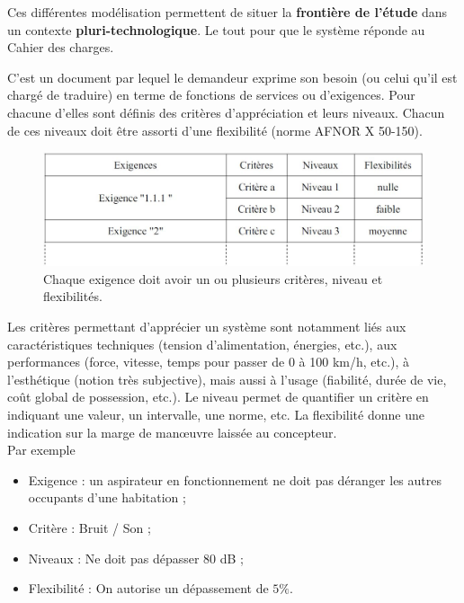 \documentclass[
	11pt, %
	fleqn, %
	a4paper, %
]{LegrandOrangeBook}
\begin{document}
Ces différentes modélisation permettent de situer la \textbf{frontière de l’étude} dans un contexte \textbf{pluri-technologique}. Le tout pour que le système réponde au Cahier des charges.\\

\begin{definition}
    C’est un document par lequel le demandeur exprime son besoin (ou celui qu'il est chargé de
traduire) en terme de fonctions de services ou d’exigences. Pour chacune d’elles sont définis
des critères d’appréciation et leurs niveaux. Chacun de ces niveaux doit être assorti d’une
flexibilité (norme AFNOR X 50-150).\\
\end{definition}

\begin{figure}[H] %
	\centering %
	\includegraphics[width=1\textwidth]{Images/sys2.JPG} %
	\caption{Chaque exigence doit avoir un ou plusieurs critères, niveau et flexibilités.}
	\label{sys2} %
\end{figure}

Les critères permettant d’apprécier un système sont notamment liés aux caractéristiques
techniques (tension d’alimentation, énergies, etc.), aux performances (force, vitesse, temps pour
passer de 0 à 100 km/h, etc.), à l’esthétique (notion très subjective), mais aussi à l’usage
(fiabilité, durée de vie, coût global de possession, etc.).
Le niveau permet de quantifier un critère en indiquant une valeur, un intervalle, une norme, etc.
La flexibilité donne une indication sur la marge de manœuvre laissée au concepteur.\\


Par exemple
\begin{itemize}
    \item Exigence : un aspirateur en fonctionnement ne doit pas déranger les autres occupants d'une habitation ;
    \item Critère : Bruit / Son ;
    \item Niveaux : Ne doit pas dépasser 80 dB ;
    \item Flexibilité : On autorise un dépassement de $5\%$.\\
\end{itemize}
\end{document}
